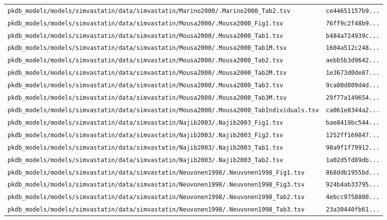 \documentclass{article}
\begin{document}
\begin{longtable}{ll}
\texttt{pkdb\_models/models/simvastatin/data/simvastatin/Marino2000/.Marino2000\_Tab2.tsv} & \texttt{ce44651157b9...} \\
\texttt{pkdb\_models/models/simvastatin/data/simvastatin/Mousa2000/.Mousa2000\_Fig1.tsv} & \texttt{76ff9c2f48b9...} \\
\texttt{pkdb\_models/models/simvastatin/data/simvastatin/Mousa2000/.Mousa2000\_Tab1.tsv} & \texttt{b484a724939c...} \\
\texttt{pkdb\_models/models/simvastatin/data/simvastatin/Mousa2000/.Mousa2000\_Tab1M.tsv} & \texttt{1604a512c248...} \\
\texttt{pkdb\_models/models/simvastatin/data/simvastatin/Mousa2000/.Mousa2000\_Tab2.tsv} & \texttt{aebb5b3d9642...} \\
\texttt{pkdb\_models/models/simvastatin/data/simvastatin/Mousa2000/.Mousa2000\_Tab2M.tsv} & \texttt{1e3673d0de87...} \\
\texttt{pkdb\_models/models/simvastatin/data/simvastatin/Mousa2000/.Mousa2000\_Tab3.tsv} & \texttt{9ca00d809d4d...} \\
\texttt{pkdb\_models/models/simvastatin/data/simvastatin/Mousa2000/.Mousa2000\_Tab3M.tsv} & \texttt{29f77a149654...} \\
\texttt{pkdb\_models/models/simvastatin/data/simvastatin/Mousa2000/.Mousa2000\_TabIndividuals.tsv} & \texttt{ca061e8344a2...} \\
\texttt{pkdb\_models/models/simvastatin/data/simvastatin/Najib2003/.Najib2003\_Fig1.tsv} & \texttt{bae8419bc544...} \\
\texttt{pkdb\_models/models/simvastatin/data/simvastatin/Najib2003/.Najib2003\_Fig2.tsv} & \texttt{1252ff169847...} \\
\texttt{pkdb\_models/models/simvastatin/data/simvastatin/Najib2003/.Najib2003\_Tab1.tsv} & \texttt{98a9f1f79912...} \\
\texttt{pkdb\_models/models/simvastatin/data/simvastatin/Najib2003/.Najib2003\_Tab2.tsv} & \texttt{1a02d5fd89db...} \\
\texttt{pkdb\_models/models/simvastatin/data/simvastatin/Neuvonen1998/.Neuvonen1998\_Fig1.tsv} & \texttt{868ddb1955bd...} \\
\texttt{pkdb\_models/models/simvastatin/data/simvastatin/Neuvonen1998/.Neuvonen1998\_Fig3.tsv} & \texttt{924b4ab33795...} \\
\texttt{pkdb\_models/models/simvastatin/data/simvastatin/Neuvonen1998/.Neuvonen1998\_Tab2.tsv} & \texttt{4ebcc9758800...} \\
\texttt{pkdb\_models/models/simvastatin/data/simvastatin/Neuvonen1998/.Neuvonen1998\_Tab3.tsv} & \texttt{23a30440fb61...} \\

\end{longtable}
\end{document}
